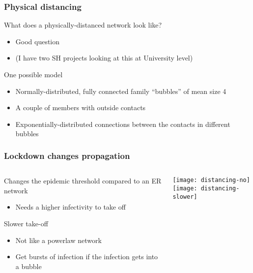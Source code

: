 \documentclass{beamer}
\begin{document}
\begin{frame}
  \frametitle{Physical distancing}

  \begin{block}{What does a physically-distanced network look like?}
    \begin{itemize}
    \item Good question
    \item (I have two SH projects looking at this at University level)
    \end{itemize}
  \end{block}

  \begin{block}{One possible model}
    \begin{itemize}
    \item Normally-distributed, fully connected family ``bubbles'' of mean size 4
    \item A couple of members with outside contacts
    \item Exponentially-distributed connections between the contacts in different bubbles
    \end{itemize}
  \end{block}
\end{frame}

\begin{frame}
  \frametitle{Lockdown changes propagation}

  \begin{columns}
    \begin{column}[c]{.7\textwidth}
      \begin{block}{Changes the epidemic threshold compared to an ER network}
        \begin{itemize}
        \item Needs a higher infectivity to take off
        \end{itemize}
      \end{block}

      \begin{block}{Slower take-off}
        \begin{itemize}
        \item Not like a powerlaw network
        \item Get bursts of infection if the infection gets into a bubble
        \end{itemize}
      \end{block}
    \end{column}
    \begin{column}[c]{.3\textwidth}
      \texttt{[image: distancing-no]}       
      \\[.5cm]
      \texttt{[image: distancing-slower]}       
    \end{column}
  \end{columns}
\end{frame}
\end{document}
